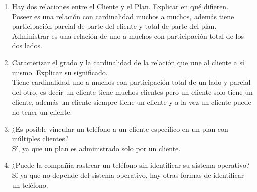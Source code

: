 \documentclass[a4paper, 12pt]{report}
\begin{document}
\begin{enumerate}
{\begin{enumerate}
{\begin{enumerate}
            sistema operativo es muchos a uno, es decir, un sistema
            operativo puede estar en varios tipos de teléfonos, pero
            un tipo de teléfono sólo tiene un sistema operativo.
            \item Hay dos relaciones entre el Cliente y el Plan. Explicar en qué
                difieren.\\
            Poseer es una relación con cardinalidad muchos a muchos,
            además tiene participación parcial de parte del cliente y
            total de parte del plan.\\
            Administrar es una relación de uno a muchos con
            participación total de los dos lados.
            \item Caracterizar el grado y la cardinalidad de la
            relación que une al cliente a sí mismo. Explicar su
            significado.\\
            Tiene cardinalidad uno a muchos con participación total de
            un lado y parcial del otro, es decir un cliente tiene muchos
            clientes pero un cliente solo tiene un cliente,
            además un cliente siempre tiene un cliente y a la vez un
            cliente puede no tener un cliente.
            \item ¿Es posible vincular un teléfono a un cliente
            específico en un plan con múltiples clientes?\\
            Sí, ya que un plan es administrado solo por un cliente.
            \item ¿Puede la compañía rastrear un teléfono sin identificar su
            sistema operativo?\\
            Sí ya que no depende del sistema operativo, hay otras
            formas de identificar un teléfono.

        \end{enumerate}
    }
\end{enumerate}
}
\end{enumerate}


\begin{thebibliography}{20}
\end{thebibliography}
\end{document}
